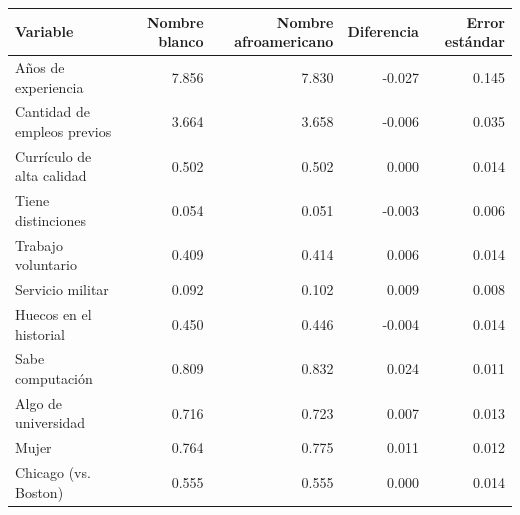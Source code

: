 
\begin{tabular}[t]{lrrrr}
\toprule
Variable & Nombre blanco & Nombre afroamericano & Diferencia & Error estándar\\
\midrule
Años de experiencia & 7.856 & 7.830 & -0.027 & 0.145\\
Cantidad de empleos previos & 3.664 & 3.658 & -0.006 & 0.035\\
Currículo de alta calidad & 0.502 & 0.502 & 0.000 & 0.014\\
Tiene distinciones & 0.054 & 0.051 & -0.003 & 0.006\\
Trabajo voluntario & 0.409 & 0.414 & 0.006 & 0.014\\
Servicio militar & 0.092 & 0.102 & 0.009 & 0.008\\
Huecos en el historial & 0.450 & 0.446 & -0.004 & 0.014\\
Sabe computación & 0.809 & 0.832 & 0.024 & 0.011\\
Algo de universidad & 0.716 & 0.723 & 0.007 & 0.013\\
Mujer & 0.764 & 0.775 & 0.011 & 0.012\\
Chicago (vs. Boston) & 0.555 & 0.555 & 0.000 & 0.014\\
\bottomrule
\end{tabular}
